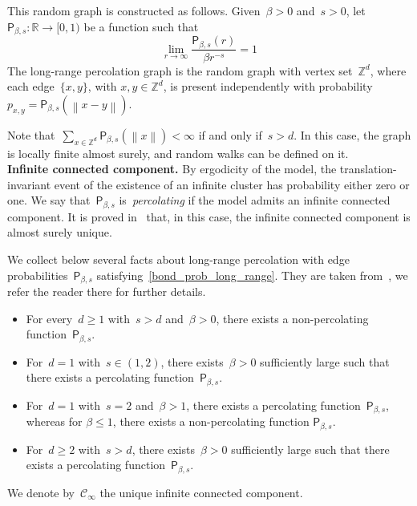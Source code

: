 \documentclass[a4paper,11pt]{article}
\newcommand{\RR}{\mathbb{R}}
\newcommand{\ZZ}{\mathbb{Z}}
\newcommand\norm[1]{\left\lVert#1\right\rVert}
\theoremstyle{definition}
\begin{document}
This random graph is constructed as follows. Given~$\beta > 0$ and~$s > 0$, let~$\mathsf P_{\beta,s}:\RR \to [0,1)$ be a function such that
\begin{equation}\label{bond_prob_long_range}
\lim_{r \to \infty} \frac{\mathsf P_{\beta,s}(r)}{ \beta r^{-s} } = 1
\end{equation}
The long-range percolation graph is the random graph with vertex set~$\ZZ^d$, where each edge~$\{x,y\}$, with $x,y \in \ZZ^d$, is present independently with probability~$p_{x,y} = \mathsf P_{\beta,s}(\norm{x-y})$. 

Note that~$\sum_{x \in \ZZ^d}\mathsf P_{\beta,s}(\norm{x}) < \infty $ if and only if~$s > d$. In this case, the graph is locally finite almost surely, and random walks can be defined on it.\\

\noindent \textbf{Infinite connected component.} By ergodicity of the model, the translation-invariant event of the existence of an infinite cluster has probability either zero or one. We say that~$\mathsf P_{\beta,s}$ is~\emph{percolating} if the model admits an infinite connected component. It is proved in~\cite{AizenmanKestenNewman87} that, in this case, the infinite connected component is almost surely unique.

We collect below several facts about long-range percolation with edge probabilities~$\mathsf P_{\beta,s}$ satisfying~\eqref{bond_prob_long_range}. They are taken from~\cite[Theorem 1.2]{Berger02}, we refer the reader there for further details. 
\begin{itemize}
    \item For every~$d \ge 1$ with~$s>d$ and~$\beta>0$, there exists a non-percolating function~$\mathsf P_{\beta,s}$. 
    \item For~$d=1$ with~$s \in (1,2)$, there exists~$\beta > 0$ sufficiently large such that there exists a percolating function~$\mathsf P_{\beta,s}$. 
    \item For~$d=1$ with~$s=2$ and~$\beta>1$, there exists a percolating function~$\mathsf P_{\beta,s}$, whereas for \(\beta \le 1\), there exists a non-percolating function \(\mathsf P_{\beta,s}\).
    \item For~$d \ge 2$ with~$s>d$, there exists~$\beta > 0$ sufficiently large such that there exists a percolating function~$\mathsf P_{\beta,s}$.
\end{itemize}
We denote by~$\mathcal C_\infty$ the unique infinite connected component.\\
\end{document}
